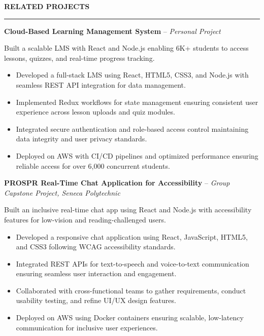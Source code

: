 \documentclass[10pt,letterpaper]{article}
\begin{document}
\vspace{6pt}

\textbf{RELATED PROJECTS}\\[-8pt]
\noindent\rule{\textwidth}{1pt}

\vspace{-2pt}

\textbf{Cloud-Based Learning Management System} -- \emph{Personal Project}

\vspace{-1pt}

Built a scalable LMS with React and Node.js enabling 6K+ students to access lessons, quizzes, and real-time progress tracking.
\vspace{-1pt}
\begin{itemize}
\item Developed a full-stack LMS using React, HTML5, CSS3, and Node.js with seamless REST API integration for data management.
\item Implemented Redux workflows for state management ensuring consistent user experience across lesson uploads and quiz modules.
\item Integrated secure authentication and role-based access control maintaining data integrity and user privacy standards.
\item Deployed on AWS with CI/CD pipelines and optimized performance ensuring reliable access for over 6,000 concurrent students.
\end{itemize}

\textbf{PROSPR  Real-Time Chat Application for Accessibility} -- \emph{Group Capstone Project, Seneca Polytechnic}

\vspace{-1pt}

Built an inclusive real-time chat app using React and Node.js with accessibility features for low-vision and reading-challenged users.
\vspace{-1pt}
\begin{itemize}
\item Developed a responsive chat application using React, JavaScript, HTML5, and CSS3 following WCAG accessibility standards.
\item Integrated REST APIs for text-to-speech and voice-to-text communication ensuring seamless user interaction and engagement.
\item Collaborated with cross-functional teams to gather requirements, conduct usability testing, and refine UI/UX design features.
\item Deployed on AWS using Docker containers ensuring scalable, low-latency communication for inclusive user experiences.
\end{itemize}
\end{document}
